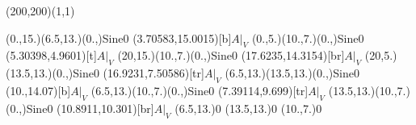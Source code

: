 \unitlength=1bp%

\begin{feynartspicture}(200,200)(1,1)

\FADiagram{}
\FAProp(0.,15.)(6.5,13.)(0.,){Sine}{0}
\FALabel(3.70583,15.0015)[b]{$A|_V$}
\FAProp(0.,5.)(10.,7.)(0.,){Sine}{0}
\FALabel(5.30398,4.9601)[t]{$A|_V$}
\FAProp(20,15.)(10.,7.)(0.,){Sine}{0}
\FALabel(17.6235,14.3154)[br]{$A|_V$}
\FAProp(20,5.)(13.5,13.)(0.,){Sine}{0}
\FALabel(16.9231,7.50586)[tr]{$A|_V$}
\FAProp(6.5,13.)(13.5,13.)(0.,){Sine}{0}
\FALabel(10.,14.07)[b]{$A|_V$}
\FAProp(6.5,13.)(10.,7.)(0.,){Sine}{0}
\FALabel(7.39114,9.699)[tr]{$A|_V$}
\FAProp(13.5,13.)(10.,7.)(0.,){Sine}{0}
\FALabel(10.8911,10.301)[br]{$A|_V$}
\FAVert(6.5,13.){0}
\FAVert(13.5,13.){0}
\FAVert(10.,7.){0}
\end{feynartspicture}

